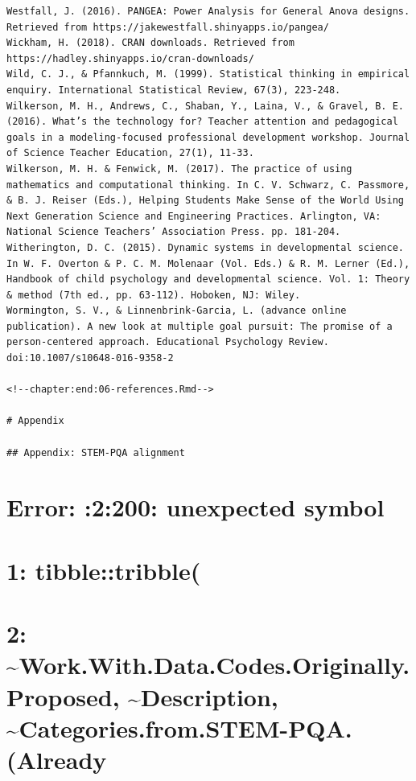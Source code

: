 \documentclass[]{book}
\theoremstyle{definition}
\theoremstyle{definition}
\theoremstyle{definition}
\theoremstyle{remark}
\begin{document}
\begin{verbatim}
Westfall, J. (2016). PANGEA: Power Analysis for General Anova designs. Retrieved from https://jakewestfall.shinyapps.io/pangea/  
Wickham, H. (2018). CRAN downloads. Retrieved from https://hadley.shinyapps.io/cran-downloads/
Wild, C. J., & Pfannkuch, M. (1999). Statistical thinking in empirical enquiry. International Statistical Review, 67(3), 223-248.  
Wilkerson, M. H., Andrews, C., Shaban, Y., Laina, V., & Gravel, B. E. (2016). What’s the technology for? Teacher attention and pedagogical goals in a modeling-focused professional development workshop. Journal of Science Teacher Education, 27(1), 11-33.  
Wilkerson, M. H. & Fenwick, M. (2017). The practice of using mathematics and computational thinking. In C. V. Schwarz, C. Passmore, & B. J. Reiser (Eds.), Helping Students Make Sense of the World Using Next Generation Science and Engineering Practices. Arlington, VA: National Science Teachers’ Association Press. pp. 181-204.  
Witherington, D. C. (2015). Dynamic systems in developmental science. In W. F. Overton & P. C. M. Molenaar (Vol. Eds.) & R. M. Lerner (Ed.), Handbook of child psychology and developmental science. Vol. 1: Theory & method (7th ed., pp. 63-112). Hoboken, NJ: Wiley.  
Wormington, S. V., & Linnenbrink-Garcia, L. (advance online publication). A new look at multiple goal pursuit: The promise of a person-centered approach. Educational Psychology Review. doi:10.1007/s10648-016-9358-2  

<!--chapter:end:06-references.Rmd-->

# Appendix

## Appendix: STEM-PQA alignment

\end{verbatim}

\section{Error: :2:200: unexpected
symbol}\label{error-2200-unexpected-symbol}

\section{1: tibble::tribble(}\label{tibbletribble}

\section{2: \textasciitilde{}Work.With.Data.Codes.Originally.Proposed,
\textasciitilde{}Description,
\textasciitilde{}Categories.from.STEM-PQA.(Already}\label{work.with.data.codes.originally.proposed-description-categories.from.stem-pqa.already}
\end{document}
